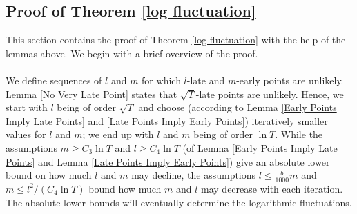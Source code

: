 \documentclass[11pt]{article}
\numberwithin{equation}{section}
\begin{document}
\subsection{Proof of Theorem \ref{log fluctuation}} 
\label{sec: high level proof of log fluct}
This section contains the proof of Theorem \ref{log fluctuation} 
with the help of the lemmas above. 
We begin with a brief overview of the proof.\\~\\
We define sequences of $l$ and $m$ for which $l$-late and $m$-early points 
are unlikely. Lemma \ref{No Very Late Point} states that 
$\sqrt{T}$-late points are unlikely.
Hence, we start with $l$ being of order $\sqrt{T}$ and
choose (according to Lemma \ref{Early Points Imply Late Points} 
and \ref{Late Points Imply Early Points}) 
iteratively smaller values for $l$ and $m$; 
we end up with $l$ and $m$ being of order $\ln T$.
While the assumptions $m \geq C_3 \ln T$ and $l \geq C_4 \ln T$ 
(of Lemma \ref{Early Points Imply Late Points} and Lemma \ref{Late Points Imply Early Points})
give an absolute lower bound on how much $l$ and $m$ may decline,
the assumptions $l \leq \frac{b}{1000} m$ and $m \leq l^2/(C_4 \ln T)$ 
bound how much $m$ and $l$ may decrease with each iteration.
The absolute lower bounds will eventually determine the 
logarithmic fluctuations. 
\end{document}
